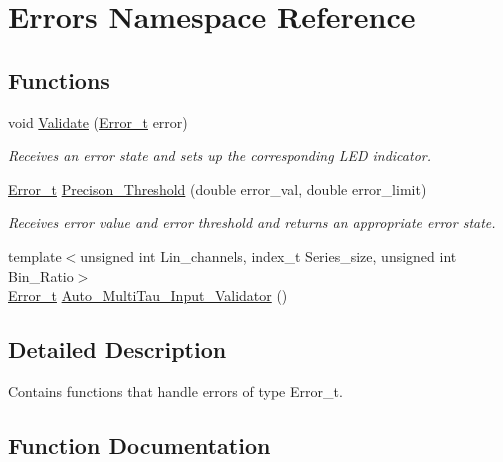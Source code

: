 \hypertarget{namespaceErrors}{}\section{Errors Namespace Reference}
\label{namespaceErrors}
\subsection*{Functions}
\begin{DoxyCompactItemize}
\item 
void \hyperlink{namespaceErrors_a51461dff689e5f46ea124f1e13806c01}{Validate} (\hyperlink{errors_8hpp_a4e8c0d09726859e3d3369c0da5a1aa7f}{Error\+\_\+t} error)
\begin{DoxyCompactList}\small\item\em Receives an error state and sets up the corresponding L\+ED indicator. \end{DoxyCompactList}\item 
\hyperlink{errors_8hpp_a4e8c0d09726859e3d3369c0da5a1aa7f}{Error\+\_\+t} \hyperlink{namespaceErrors_a13171d3d324164c9f7a9508d5a16b0c5}{Precison\+\_\+\+Threshold} (double error\+\_\+val, double error\+\_\+limit)
\begin{DoxyCompactList}\small\item\em Receives error value and error threshold and returns an appropriate error state. \end{DoxyCompactList}\item 
{\footnotesize template$<$unsigned int Lin\+\_\+channels, index\+\_\+t Series\+\_\+size, unsigned int Bin\+\_\+\+Ratio$>$ }\\\hyperlink{errors_8hpp_a4e8c0d09726859e3d3369c0da5a1aa7f}{Error\+\_\+t} \hyperlink{namespaceErrors_a7010d07de8236f9a17b302c78f37483e}{Auto\+\_\+\+Multi\+Tau\+\_\+\+Input\+\_\+\+Validator} ()
\end{DoxyCompactItemize}


\subsection{Detailed Description}
Contains functions that handle errors of type {\ttfamily Error\+\_\+t}. 

\subsection{Function Documentation}
\mbox{\label{namespaceErrors_a7010d07de8236f9a17b302c78f37483e}} 
